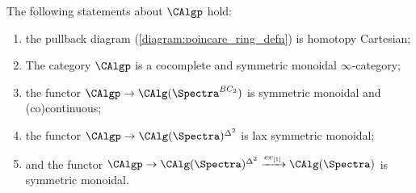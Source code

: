 \begin{theorem}
The following statements about $\CAlgp$ hold:
\begin{enumerate}
\item \label{thmitem:defining_diagram_homotopy_pullback} the pullback diagram (\ref{diagram:poincare_ring_defn}) is homotopy Cartesian; 
\item \label{thmitem:poincare_ring_has_colimits} The category $\CAlgp$ is a cocomplete and symmetric monoidal $ \infty $-category;
\item \label{thmitem:poincare_ring_to_ring_preserves_colims} the functor $ \CAlgp \to \CAlg(\Spectra^{BC_2})$ is symmetric monoidal and (co)continuous;
\item the functor $ \CAlgp\to \CAlg(\Spectra)^{\Delta^2}$ is lax symmetric monoidal;
\item and the functor $ \CAlgp\to \CAlg(\Spectra)^{\Delta^2}\xrightarrow{ev_{[1]}} \CAlg(\Spectra)$ is symmetric monoidal.
\end{enumerate}
\end{theorem}
